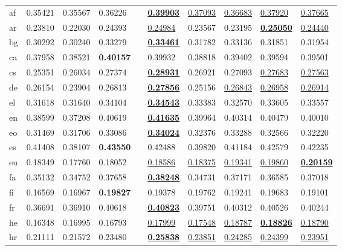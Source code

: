 \begin{longtable}{llllllllll}
af & 0.35421 & 0.35567 & 0.36226 &  & \underline{\textbf{0.39903}} & \underline{0.37093} & \underline{0.36683} & \underline{0.37920} & \underline{0.37665} \\
ar & 0.23810 & 0.22030 & 0.24393 &  & \underline{0.24984} & 0.23567 & 0.23195 & \underline{\textbf{0.25050}} & \underline{0.24440} \\
bg & 0.30292 & 0.30240 & 0.33279 &  & \underline{\textbf{0.33461}} & 0.31782 & 0.33136 & 0.31851 & 0.31954 \\
ca & 0.37958 & 0.38521 & \textbf{0.40157} &  & 0.39932 & 0.38818 & 0.39402 & 0.39594 & 0.39501 \\
cs & 0.25351 & 0.26034 & 0.27374 &  & \underline{\textbf{0.28931}} & 0.26921 & 0.27093 & \underline{0.27683} & \underline{0.27563} \\
de & 0.26154 & 0.23904 & 0.26813 &  & \underline{\textbf{0.27856}} & 0.25156 & \underline{0.26843} & \underline{0.26958} & \underline{0.26914} \\
el & 0.31618 & 0.31640 & 0.34104 &  & \underline{\textbf{0.34543}} & 0.33383 & 0.32570 & 0.33605 & 0.33557 \\
en & 0.38599 & 0.37208 & 0.40619 &  & \underline{\textbf{0.41635}} & 0.39964 & 0.40314 & 0.40479 & 0.40010 \\
eo & 0.31469 & 0.31706 & 0.33086 &  & \underline{\textbf{0.34024}} & 0.32376 & 0.33288 & 0.32566 & 0.32220 \\
es & 0.41408 & 0.38107 & \textbf{0.43550} &  & 0.42488 & 0.39820 & 0.41184 & 0.42579 & 0.42235 \\
eu & 0.18349 & 0.17760 & 0.18052 &  & \underline{0.18586} & \underline{0.18375} & \underline{0.19341} & \underline{0.19860} & \underline{\textbf{0.20159}} \\
fa & 0.35132 & 0.34752 & 0.37658 &  & \underline{\textbf{0.38248}} & 0.34731 & 0.37171 & 0.36585 & 0.37018 \\
fi & 0.16569 & 0.16967 & \textbf{0.19827} &  & 0.19378 & 0.19762 & 0.19241 & 0.19683 & 0.19101 \\
fr & 0.36691 & 0.36910 & 0.40618 &  & \underline{\textbf{0.40823}} & 0.39751 & 0.40312 & 0.40526 & 0.40244 \\
he & 0.16348 & 0.16995 & 0.16793 &  & \underline{0.17999} & \underline{0.17548} & \underline{0.18787} & \underline{\textbf{0.18826}} & \underline{0.18790} \\
hr & 0.21111 & 0.21572 & 0.23480 &  & \underline{\textbf{0.25838}} & \underline{0.23851} & \underline{0.24285} & \underline{0.24399} & \underline{0.23951} \\

\end{longtable}
